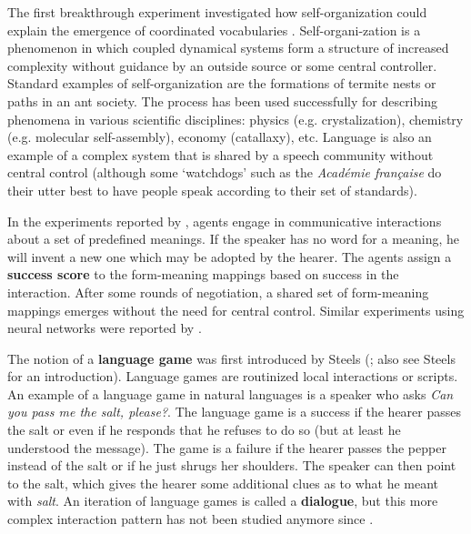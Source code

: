 The first breakthrough experiment investigated how self-organization could explain the emergence of coordinated vocabularies \citep{steels97selforganizing}. Self-organi-zation is a phenomenon in which coupled dynamical systems form a structure of increased complexity without guidance by an outside source or some central controller. Standard examples of self-organization are the formations of termite nests or paths in an ant society. The process has been used successfully for describing phenomena in various scientific disciplines: physics (e.g. crystalization), chemistry (e.g. molecular self-assembly), economy (catallaxy), etc. Language is also an example of a complex system that is shared by a speech community without central control (although some `watchdogs' such as the {\em Acad\'{e}mie fran\c{c}aise} do their utter best to have people speak according to their set of standards). 

In the experiments reported by \citet{steels97selforganizing}, agents engage in communicative interactions about a set of predefined meanings. If the speaker has no word for a meaning, he will invent a new one which may be adopted by the hearer. The agents assign a {\bfseries success score} to the form-meaning mappings based on success in the interaction. After some rounds of negotiation, a shared set of form-meaning mappings emerges without the need for central control. Similar experiments using neural networks were reported by \citet{batali98computational}.

The notion of a {\bfseries language game} was first introduced by Steels (\citeyear{steels96selforganizing}; also see Steels \citeyear{steels01language} for an introduction). Language games are routinized local interactions or scripts. An example of a language game in natural languages is a speaker who asks {\em Can you pass me the salt, please?}. The language game is a success if the hearer passes the salt or even if he responds that he refuses to do so (but at least he understood the message). The game is a failure if the hearer passes the pepper instead of the salt or if he just shrugs her shoulders. The speaker can then point to the salt, which gives the hearer some additional clues as to what he meant with {\em salt}. An iteration of language games is called a {\bfseries dialogue}, but this more complex interaction pattern has not been studied anymore since \citet{steels96selforganizing}. 

